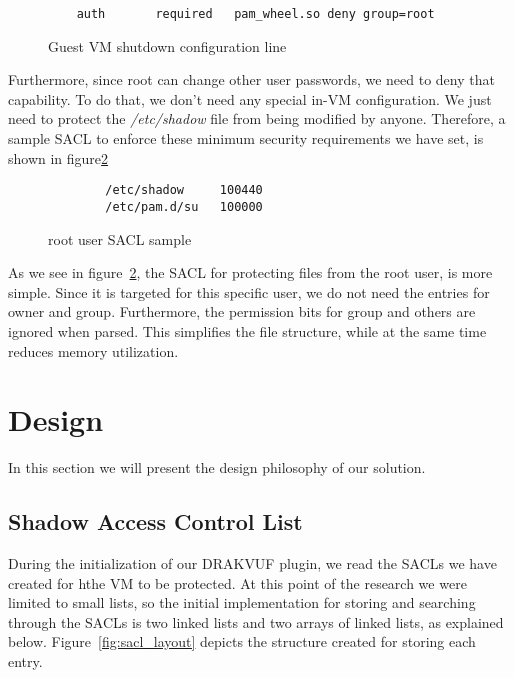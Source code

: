 \begin{figure}[ht]
	\centering
	\begin{lstlisting}
	auth       required   pam_wheel.so deny group=root	
	\end{lstlisting}
	\caption{Guest \ac{VM} shutdown configuration line}
	\label{fig:pam}
\end{figure}

\par Furthermore, since root can change other user passwords, we need to deny that capability. To do that, we don't need any special in-\ac{VM} configuration. We just need to protect the \textit{/etc/shadow} file from being modified by anyone. Therefore, a sample \ac{SACL} to enforce these minimum security requirements we have set, is shown in figure\ref{fig:root_sacl}

\begin{figure}[ht]
	\centering
	\begin{lstlisting}
		/etc/shadow     100440
		/etc/pam.d/su   100000
	\end{lstlisting}
	\caption{root user \ac{SACL} sample}
	\label{fig:root_sacl}
\end{figure}

\par As we see in figure~\ref{fig:root_sacl}, the \ac{SACL} for protecting files from the root user, is more simple. Since it is targeted for this specific user, we do not need the entries for owner and group. Furthermore, the permission bits for group and others are ignored when parsed. This simplifies the file structure, while at the same time reduces memory utilization.



\section{Design}\label{sec:design}
In this section we will present the design philosophy of our solution.

\subsection{Shadow Access Control List}\label{sub:sacl}
During the initialization of our DRAKVUF plugin, we read the \ac{SACL}s we have created for hthe \ac{VM} to be protected. At this point of the research we were limited to small lists, so the initial implementation for storing and searching through the \ac{SACL}s is two linked lists and two arrays of linked lists, as explained below. Figure~\ref{fig:sacl_layout} depicts the structure created for storing each entry.

